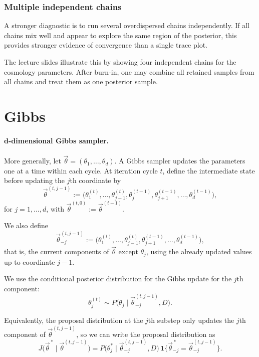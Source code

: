 \documentclass[11pt, titlepage]{article} %
\numberwithin{equation}{section}
\theoremstyle{definition}
\numberwithin{assumption}{section}
\begin{document}
\subsubsection*{Multiple independent chains}

A stronger diagnostic is to run several overdispersed chains independently. If all chains mix well and appear to explore the same region of the posterior, this provides stronger evidence of convergence than a single trace plot.

The lecture slides illustrate this by showing four independent chains for the cosmology parameters. After burn-in, one may combine all retained samples from all chains and treat them as one posterior sample.

\section{Gibbs}

\paragraph{d-dimensional Gibbs sampler.}
More generally, let $\vec{\theta}=(\theta_1,\dots,\theta_d)$. A Gibbs sampler updates the parameters one at a time within each cycle. At iteration cycle $t$, define the intermediate state before updating the $j$th coordinate by
\begin{equation*}
\vec{\theta}^{(t,j-1)}
:=
\bigl(
\theta_1^{(t)},\dots,\theta_{j-1}^{(t)},\theta_j^{(t-1)},\theta_{j+1}^{(t-1)},\dots,\theta_d^{(t-1)}
\bigr),
\end{equation*}
for $j=1,\dots,d$, with $\vec{\theta}^{(t,0)}:=\vec{\theta}^{(t-1)}$.

We also define
\begin{equation*}
\vec{\theta}_{-j}^{(t,j-1)}
:=
\bigl(
\theta_1^{(t)},\dots,\theta_{j-1}^{(t)},\theta_{j+1}^{(t-1)},\dots,\theta_d^{(t-1)}
\bigr),
\end{equation*}
that is, the current components of $\vec{\theta}$ except $\theta_j$, using the already updated values up to coordinate $j-1$.

We use the conditional posterior distribution for the Gibbs update for the $j$th component:
\begin{equation*}
\theta_j^{(t)} \sim P\bigl(\theta_j \mid \vec{\theta}_{-j}^{(t,j-1)}, D\bigr).
\end{equation*}

Equivalently, the proposal distribution at the $j$th substep only updates the $j$th component of $\vec{\theta}^{(t,j-1)}$, so we can write the proposal distribution as
\begin{equation*}
J\bigl(\vec{\theta}^{\,*} \mid \vec{\theta}^{(t,j-1)}\bigr)
=
P\bigl(\theta_j^* \mid \vec{\theta}_{-j}^{(t,j-1)}, D\bigr)
\,\mathbf{1}\bigl\{\vec{\theta}_{-j}^{\,*}=\vec{\theta}_{-j}^{(t,j-1)}\bigr\}.
\end{equation*}
\end{document}
